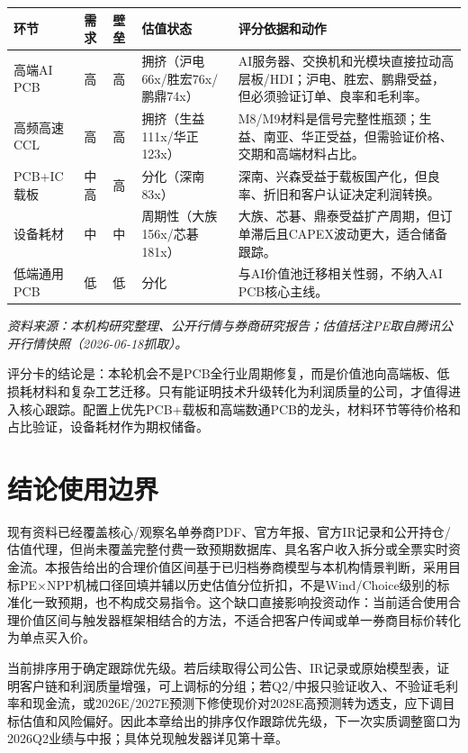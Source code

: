 \begin{exhibitbox}[图表1-4：环节评分和配置含义]
\small
\begin{tabularx}{\textwidth}{L{2.4cm}C{1.0cm}C{1.0cm}L{2.6cm}X}
\toprule
\textbf{环节} & \textbf{需求} & \textbf{壁垒} & \textbf{估值状态} & \textbf{评分依据和动作} \\
\midrule
高端AI PCB & 高 & 高 & 拥挤（沪电66x/胜宏76x/鹏鼎74x） & AI服务器、交换机和光模块直接拉动高层板/HDI；沪电、胜宏、鹏鼎受益，但必须验证订单、良率和毛利率。 \\
高频高速CCL & 高 & 高 & 拥挤（生益111x/华正123x） & M8/M9材料是信号完整性瓶颈；生益、南亚、华正受益，但需验证价格、交期和高端材料占比。 \\
PCB+IC载板 & 中高 & 高 & 分化（深南83x） & 深南、兴森受益于载板国产化，但良率、折旧和客户认证决定利润转换。 \\
设备耗材 & 中 & 中 & 周期性（大族156x/芯碁181x） & 大族、芯碁、鼎泰受益扩产周期，但订单滞后且CAPEX波动更大，适合储备跟踪。 \\
低端通用PCB & 低 & 低 & 分化 & 与AI价值池迁移相关性弱，不纳入AI PCB核心主线。 \\
\bottomrule
\end{tabularx}
\par{\scriptsize\color{mutedgrey}\textit{资料来源：本机构研究整理、公开行情与券商研究报告；估值括注PE取自腾讯公开行情快照（2026-06-18抓取）。}}
\end{exhibitbox}

评分卡的结论是：本轮机会不是PCB全行业周期修复，而是价值池向高端板、低损耗材料和复杂工艺迁移。只有能证明技术升级转化为利润质量的公司，才值得进入核心跟踪。配置上优先PCB+载板和高端数通PCB的龙头，材料环节等待价格和占比验证，设备耗材作为期权储备。

\section{结论使用边界}

现有资料已经覆盖核心/观察名单券商PDF、官方年报、官方IR记录和公开持仓/估值代理，但尚未覆盖完整付费一致预期数据库、具名客户收入拆分或全票实时资金流。本报告给出的合理价值区间基于已归档券商模型与本机构情景判断，采用目标PE$\times$NPP机械口径回填并辅以历史估值分位折扣，不是Wind/Choice级别的标准化一致预期，也不构成交易指令。这个缺口直接影响投资动作：当前适合使用合理价值区间与触发器框架相结合的方法，不适合把客户传闻或单一券商目标价转化为单点买入价。

\begin{sourcequalitybox}[结论使用边界]
当前排序用于确定跟踪优先级。若后续取得公司公告、IR记录或原始模型表，证明客户链和利润质量增强，可上调标的分组；若Q2/中报只验证收入、不验证毛利率和现金流，或2026E/2027E预测下修使现价对2028E高预测转为透支，应下调目标估值和风险偏好。因此本章给出的排序仅作跟踪优先级，下一次实质调整窗口为2026Q2业绩与中报；具体兑现触发器详见第十章。
\end{sourcequalitybox}
